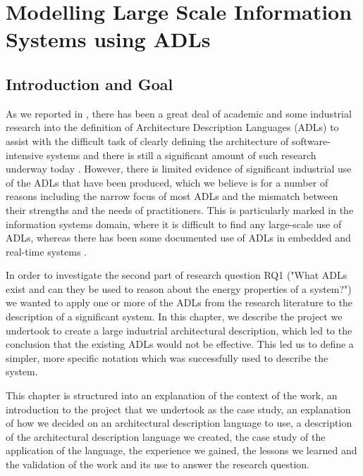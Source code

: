 \chapter{Modelling Large Scale Information Systems using ADLs} \label{chapter:usingadls}

\section{Introduction and Goal}

  As we reported in , there has been a great deal of academic and some industrial research into the definition of Architecture Description Languages (ADLs) to assist with the difficult task of clearly defining the architecture of software-intensive systems and there is still a significant amount of such research underway today \cite{diruscio2010-byadl, cuenot2010-east}.  However, there is limited evidence of significant industrial use of the ADLs that have been produced, which we believe is for a number of reasons \cite{bashroush2006-flexibleadls, woodshilliard2005-adlsinpractice} including the narrow focus of most ADLs and the mismatch between their strengths and the needs of practitioners.  This is particularly marked in the information systems domain, where it is difficult to find any large-scale use of ADLs, whereas there has been some documented use of ADLs in embedded and real-time systems \cite{oquendo2004-piadl, vanommering2000-koala, allen2002-rtsystems}.

  In order to investigate the second part of research question RQ1 ("What ADLs exist and can they be used to reason about the energy properties of a system?") we wanted to apply one or more of the ADLs from the research literature to the description of a significant system.  In this chapter, we describe the project we undertook to create a large industrial architectural description, which led to the conclusion that the existing ADLs would not be effective.  This led us to define a simpler, more specific notation which was successfully used to describe the system.

  This chapter is structured into an explanation of the context of the work, an introduction to the project that we undertook as the case study, an explanation of how we decided on an architectural description language to use, a description of the architectural description language we created, the case study of the application of the language, the experience we gained, the lessons we learned and the validation of the work and its use to answer the research question.

